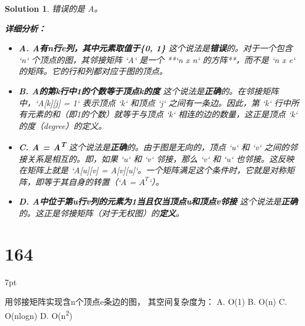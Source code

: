 \documentclass[UTF8]{report}
\newtheorem{solution}{Solution}
\theoremstyle{MyLineTheoremStyle} %
\theoremstyle{MyBlockTheoremStyle} %
\theoremstyle{MySubsubsectionStyle} %
\newenvironment{graybox}{%
        \def\FrameCommand{%
        \hspace{1pt}%
        {\color{gray}\small \vrule width 2pt}%
        {\color{graybox_color}\vrule width 4pt}%
        \colorbox{graybox_color}%
        }%
        \MakeFramed{\advance\hsize-\width\FrameRestore}%
        \noindent\hspace{-4.55pt}%
        \begin{adjustwidth}{}{7pt}%
        \vspace{2pt}\vspace{2pt}%
        }
        {%
        \vspace{2pt}\end{adjustwidth}\endMakeFramed%
        }
\begin{document}
\begin{solution}
错误的是 A。

\textbf{详细分析：}

\begin{itemize}
    \item \textbf{A. A有n行e列，其中元素取值于\{0, 1\}}
    这个说法是\textbf{错误}的。对于一个包含 `n` 个顶点的图，其邻接矩阵 `A` 是一个 **`n x n` 的方阵**，而不是 `n x e` 的矩阵。它的行和列都对应于图的顶点。

    \item \textbf{B. A的第k行中1的个数等于顶点k的度}
    这个说法是\textbf{正确}的。在邻接矩阵中，`A[k][j] = 1` 表示顶点 `k` 和顶点 `j` 之间有一条边。因此，第 `k` 行中所有元素的和（即1的个数）就等于与顶点 `k` 相连的边的数量，这正是顶点 `k` 的度（degree）的定义。

    \item \textbf{C. A = A\textsuperscript{T}}
    这个说法是\textbf{正确}的。由于图是无向的，顶点 `u` 和 `v` 之间的邻接关系是相互的。即，如果 `u` 和 `v` 邻接，那么 `v` 和 `u` 也邻接。这反映在矩阵上就是 `A[u][v] = A[v][u]`。一个矩阵满足这个条件时，它就是对称矩阵，即等于其自身的转置（`A = $A^T$`）。

    \item \textbf{D. A中位于第u行v列的元素为1当且仅当顶点u和顶点v邻接}
    这个说法是\textbf{正确}的。这正是邻接矩阵（对于无权图）的\textbf{定义}。
\end{itemize}
\end{solution}

\section*{164}
\begin{graybox}
用邻接矩阵实现含n个顶点e条边的图，
其空间复杂度为：
A. O(1)
B. O(n)
C. O(nlogn)
D. O(n\textsuperscript{2})
\end{graybox}
\end{document}

